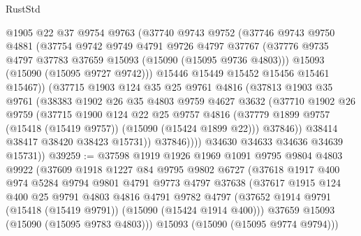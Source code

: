 \begin{lexlean}{RustStd}
\begin{coremodule}
              @1905
              @22
              @37
              @9754
              @9763
              (@37740
                @9743
                @9752
                (@37746
                  @9743
                  @9750
                  @4881
                  (@37754
                    @9742
                    @9749
                    @4791
                    @9726
                    @4797
                    @37767
                    (@37776 @9735 @4797 @37783 @37659 @15093 (@15090 (@15095 @9736 @4803)))
                    @15093
                    (@15090 (@15095 @9727 @9742)))
                  @15446
                  @15449
                  @15452
                  @15456
                  @15461
                  @15467))
              (@37715
                @1903
                @124
                @35
                @25
                @9761
                @4816
                (@37813
                  @1903
                  @35
                  @9761
                  (@38383
                    @1902
                    @26
                    @35
                    @4803
                    @9759
                    @4627
                    @3632
                    (@37710
                      @1902
                      @26
                      @9759
                      (@37715
                        @1900
                        @124
                        @22
                        @25
                        @9757
                        @4816
                        (@37779 @1899 @9757 (@15418 (@15419 @9757)) (@15090 (@15424 @1899 @22)))
                        @37846))
                    @38414
                    @38417
                    @38420
                    @38423
                    @15731))
                @37846))))
        @34630
        @34633
        @34636
        @34639
        @15731))
@39259 := @37598
    @1919
    @1926
    @1969
    @1091
    @9795
    @9804
    @4803
    @9922
    (@37609
      @1918
      @1227
      @84
      @9795
      @9802
      @6727
      (@37618
        @1917
        @400
        @974
        @5284
        @9794
        @9801
        @4791
        @9773
        @4797
        @37638
        (@37617
          @1915
          @124
          @400
          @25
          @9791
          @4803
          @4816
          @4791
          @9782
          @4797
          (@37652 @1914 @9791 (@15418 (@15419 @9791)) (@15090 (@15424 @1914 @400)))
          @37659
          @15093
          (@15090 (@15095 @9783 @4803)))
        @15093
        (@15090 (@15095 @9774 @9794)))

\end{coremodule}
\end{lexlean}
